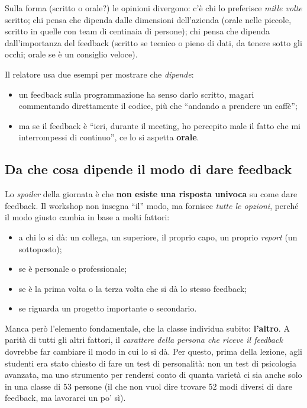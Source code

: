 Sulla forma (scritto o orale?) le opinioni divergono: c'è chi lo preferisce
\emph{mille volte} scritto; chi pensa che dipenda dalle dimensioni
dell'azienda (orale nelle piccole, scritto in quelle con team di centinaia di
persone); chi pensa che dipenda dall'importanza del feedback (scritto se
tecnico o pieno di dati, da tenere sotto gli occhi; orale se è un consiglio
veloce).

Il relatore usa due esempi per mostrare che \emph{dipende}:
\begin{itemize}
  \item un feedback sulla programmazione ha senso darlo scritto, magari
        commentando direttamente il codice, più che ``andando a prendere un
        caffè'';
  \item ma se il feedback è ``ieri, durante il meeting, ho percepito male il
        fatto che mi interrompessi di continuo'', ce lo si aspetta
        \textbf{orale}.
\end{itemize}

\subsection{Da che cosa dipende il modo di dare feedback}

Lo \emph{spoiler} della giornata è che \textbf{non esiste una risposta univoca}
su come dare feedback. Il workshop non insegna ``il'' modo, ma fornisce
\emph{tutte le opzioni}, perché il modo giusto cambia in base a molti fattori:
\begin{itemize}
  \item a chi lo si dà: un collega, un superiore, il proprio capo, un proprio
        \emph{report} (un sottoposto);
  \item se è personale o professionale;
  \item se è la prima volta o la terza volta che si dà lo stesso feedback;
  \item se riguarda un progetto importante o secondario.
\end{itemize}

Manca però l'elemento fondamentale, che la classe individua subito:
\textbf{l'altro}. A parità di tutti gli altri fattori, il \emph{carattere
della persona che riceve il feedback} dovrebbe far cambiare il modo in cui lo
si dà. Per questo, prima della lezione, agli studenti era stato chiesto di
fare un test di personalità: non un test di psicologia avanzata, ma uno
strumento per rendersi conto di quanta varietà ci sia anche solo in una
classe di 53 persone (il che non vuol dire trovare 52 modi diversi di dare
feedback, ma lavorarci un po' sì).

